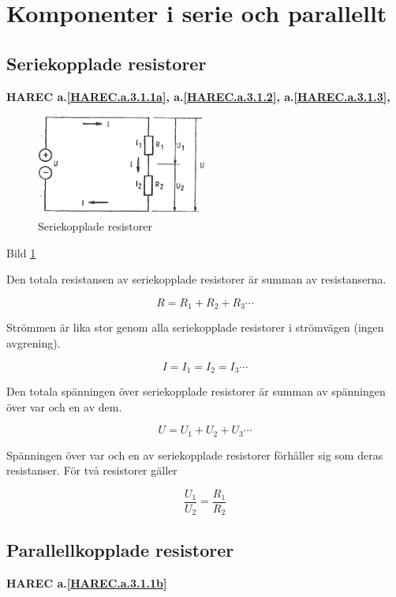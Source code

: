 \section[Serie och parallelt]{Komponenter i serie och parallellt}

\subsection{Seriekopplade resistorer}
\textbf{HAREC
  a.\ref{HAREC.a.3.1.1a}\label{myHAREC.a.3.1.1a},
  a.\ref{HAREC.a.3.1.2}\label{myHAREC.a.3.1.2a},
  a.\ref{HAREC.a.3.1.3}\label{myHAREC.a.3.1.3a},
}

\begin{figure}
\includegraphics[width=0.5\textwidth]{images/cropped_pdfs/bild_2_3-01.pdf}
\caption{Seriekopplade resistorer}
\label{fig:BildII3-01}
\end{figure}

Bild \ref{fig:BildII3-01}

Den totala resistansen av seriekopplade resistorer är summan av resistanserna.

\[R = R_1 + R_2 + R_3 \cdots \]

Strömmen är lika stor genom alla seriekopplade resistorer i strömvägen (ingen
avgrening).

\[I = I_1 = I_2 = I_3 \cdots \]

Den totala spänningen över seriekopplade resistorer är summan av spänningen över
var och en av dem.

\[U = U_1 + U_2 + U_3 \cdots \]

Spänningen över var och en av seriekopplade resistorer förhåller sig som deras
resistanser. För två resistorer gäller

\[\frac{U_1}{U_2} = \frac{R_1}{R_2}\]


\subsection{Parallellkopplade resistorer}
\textbf{HAREC a.\ref{HAREC.a.3.1.1b}\label{myHAREC.a.3.1.1b}}

